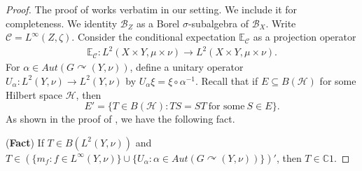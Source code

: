 \documentclass[12pt]{amsart}
\theoremstyle{definition}
\begin{document}
\begin{proof}
The proof of \cite[Lemma 4.1]{ben-pinsker} 
works verbatim in our setting. We include it for completeness. We identity $\mathcal{B}_Z$ as a Borel $\sigma$-subalgebra of $\mathcal{B}_X$. Write $\mathcal{C}=L^{\infty}(Z,\zeta)$. Consider the conditional expectation $\mathbb{E}_{\mathcal{C}}$ as a projection operator
\begin{align*}
\mathbb{E}_{\mathcal{C}}: L^2(X\times Y,\mu\times \nu)\rightarrow L^2(X\times Y, \mu\times \nu).
\end{align*}
For $\alpha\in Aut(G\curvearrowright (Y,\nu))$, define a unitary operator $U_{\alpha}: L^2(Y,\nu)\rightarrow L^2(Y,\nu)$ by $U_{\alpha}\xi=\xi\circ \alpha^{-1}$. Recall that if $E\subseteq B(\mathcal{H})$ for some Hilbert space $\mathcal{H}$, then \[E'=\{T\in B(\mathcal{H}): TS=ST~\text{for some}~S\in E\}.\]
As shown in the proof of  \cite[Lemma 4.1]{ben-pinsker}, we have the following fact. 

(\textbf{Fact}) If $T\in B(L^2(Y,\nu))$ and $T\in (\{m_f: f\in L^{\infty}(Y,\nu)\}\cup \{U_{\alpha}: \alpha \in Aut(G\curvearrowright (Y,\nu))\})'$, then $T\in \mathbb{C}1$.



\end{proof}
\end{document}
